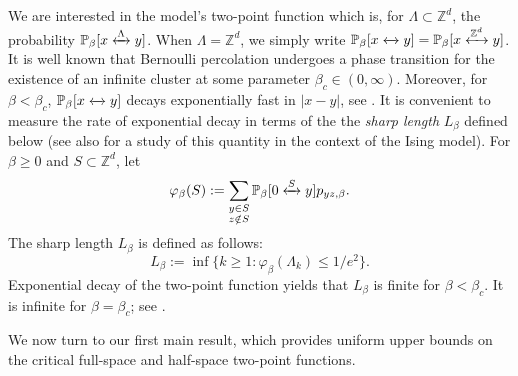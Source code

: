 \documentclass[11pt,a4paper]{article}
\numberwithin{equation}{section}
\theoremstyle{plain}
\theoremstyle{definition}
\newcommand{\connect}{\xleftrightarrow}
\begin{document}
  We are interested in the model's two-point function which is, for $\Lambda \subset \mathbb Z^d$, the probability
 $\mathbb P_\beta[x\connect{\Lambda\:}y]$.
When $\Lambda=\mathbb Z^d$, we simply write $\mathbb P_\beta[x\connect{}y]=\mathbb P_\beta[x\connect{\mathbb Z^d\:}y]$.
 It is well known that Bernoulli percolation undergoes a phase transition for the existence of an infinite cluster at some parameter $\beta_c\in (0,\infty)$. Moreover, for $\beta<\beta_c$, $\mathbb P_\beta[x\connect{}y]$ decays exponentially fast in $|x-y|$, see \cite{AizenmanNewmanTreeGraphInequalities1984,Mensikov1986coincidence,AizenmanBarsky1987sharpnessPerco,DuminilTassionNewProofSharpness2016}. It is convenient to measure the rate of exponential decay in terms of the the \emph{sharp length} $L_\beta$ defined below (see also \cite{DuminilTassionNewProofSharpness2016,PanisTriviality2023,DuminilPanis2024newLB} for a study of this quantity in the context of the Ising model). For $\beta\geq 0$ and $S\subset \mathbb Z^d$, let
\begin{equation}
	\varphi_\beta(S):=\sum_{\substack{y\in S\\ z\notin S}}\mathbb P_\beta[0\connect{S\:}y]p_{yz,\beta}.
\end{equation}
The sharp length $L_\beta$ is defined as follows:
\begin{equation}\label{eq: def L beta}
    L_\beta:=\inf\{k\ge1:\varphi_\beta(\Lambda_k)\le1/e^2\}.
\end{equation}
Exponential decay of the two-point function yields that $L_\beta$ is finite for $\beta<\beta_c$. It is infinite for $\beta=\beta_c$; see \cite{SimonInequalityIsing1980}.

We now turn to our first main result, which provides uniform upper bounds on the critical full-space and half-space two-point functions.
\end{document}

